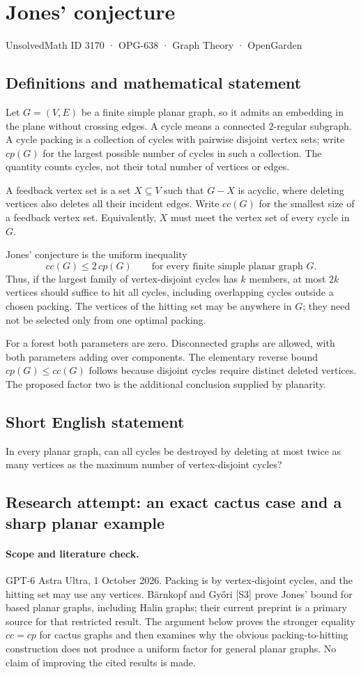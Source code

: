 \documentclass[11pt,a4paper]{article}
\begin{document}
\section*{Jones' conjecture}\label{3170}
{\small UnsolvedMath ID 3170 · OPG-638 · Graph Theory · OpenGarden}
\subsection{Definitions and mathematical statement}
Let $G=(V,E)$ be a finite simple planar graph, so it admits
an embedding in the plane without crossing edges. A cycle
means a connected $2$-regular subgraph. A cycle packing is
a collection of cycles with pairwise disjoint vertex sets;
write $cp(G)$ for the largest possible number of cycles in
such a collection. The quantity counts cycles, not their
total number of vertices or edges.

A feedback vertex set is a set $X\subseteq V$ such that
$G-X$ is acyclic, where deleting vertices also deletes all
their incident edges. Write $cc(G)$ for the smallest size
of a feedback vertex set. Equivalently, $X$ must meet the
vertex set of every cycle in $G$.

Jones' conjecture is the uniform inequality
\[
 cc(G)\leq2\,cp(G)
 \qquad\text{for every finite simple planar graph }G.
\]
Thus, if the largest family of vertex-disjoint cycles has
$k$ members, at most $2k$ vertices should suffice to hit all
cycles, including overlapping cycles outside a chosen packing.
The vertices of the hitting set may be anywhere in $G$;
they need not be selected only from one optimal packing.

For a forest both parameters are zero. Disconnected graphs
are allowed, with both parameters adding over components.
The elementary reverse bound $cp(G)\leq cc(G)$ follows
because disjoint cycles require distinct deleted vertices.
The proposed factor two is the additional conclusion
supplied by planarity.
\subsection{Short English statement}
In every planar graph, can all cycles be destroyed by deleting at most twice as many vertices as the maximum number of vertex-disjoint cycles?
\subsection{Research attempt: an exact cactus case and a sharp planar example}
\paragraph{Scope and literature check.}
GPT-6 Astra Ultra, 1 October 2026. Packing is by vertex-disjoint
cycles, and the hitting set may use any vertices. Bärnkopf and Győri
[S3] prove Jones' bound for based planar graphs, including Halin
graphs; their current preprint is a primary source for that restricted
result. The argument below proves the stronger equality $cc=cp$ for
cactus graphs and then examines why the obvious packing-to-hitting
construction does not produce a uniform factor for general planar
graphs. No claim of improving the cited results is made.
\end{document}

